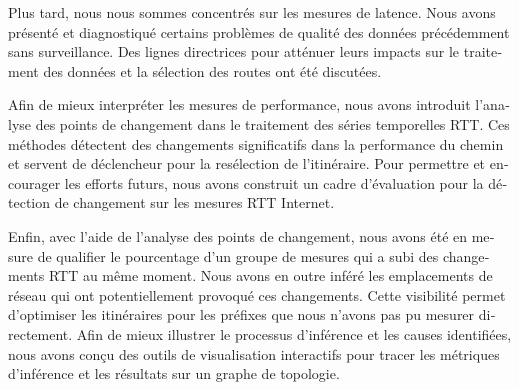 \begin{otherlanguage}{french}
Plus tard, nous nous sommes concentrés sur les mesures de latence.
Nous avons présenté et diagnostiqué certains problèmes de qualité des données précédemment sans surveillance.
Des lignes directrices pour atténuer leurs impacts sur le traitement des données et la sélection des routes ont été discutées.

Afin de mieux interpréter les mesures de performance, nous avons introduit l'analyse des points de changement dans le traitement des séries temporelles RTT.
Ces méthodes détectent des changements significatifs dans la performance du chemin et servent de déclencheur pour la resélection de l'itinéraire.
Pour permettre et encourager les efforts futurs, nous avons construit un cadre d'évaluation pour la détection de changement sur les mesures RTT Internet.

Enfin, avec l'aide de l'analyse des points de changement, nous avons été en mesure de qualifier le pourcentage d'un groupe de mesures qui a subi des changements RTT au même moment.
Nous avons en outre inféré les emplacements de réseau qui ont potentiellement provoqué ces changements.
Cette visibilité permet d'optimiser les itinéraires pour les préfixes que nous n'avons pas pu mesurer directement.
Afin de mieux illustrer le processus d'inférence et les causes identifiées, nous avons conçu des outils de visualisation interactifs pour tracer les métriques d'inférence et les résultats sur un graphe de topologie.


\end{otherlanguage}
\endgroup			

